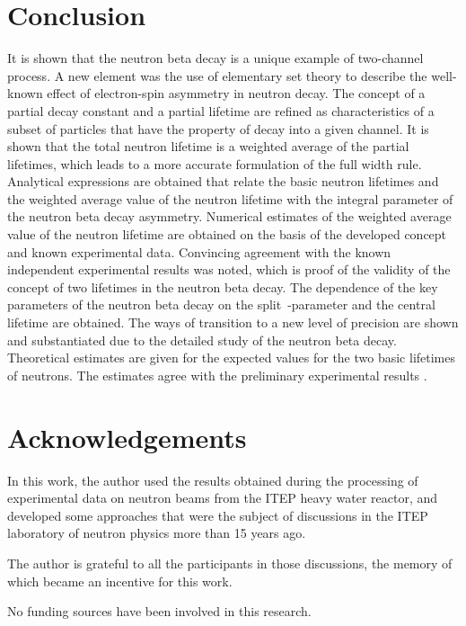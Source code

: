 \documentclass[article]{elsarticle}
\begin{document}
\section{Conclusion} 
\label{sect5:CONCL}
It is shown that the neutron beta decay is a unique example of two-channel process. A new element was the use of elementary set theory to describe the well-known effect of electron-spin asymmetry in neutron decay. The concept of a partial decay constant and a partial lifetime are refined as characteristics of a subset of particles that have the property of decay into a given channel. It is shown that the total neutron lifetime is a weighted average of the partial lifetimes, which leads to a more accurate formulation of the full width rule. Analytical expressions are obtained that relate the basic neutron lifetimes and the weighted average value of the neutron lifetime with the integral parameter of the neutron beta decay asymmetry.
Numerical estimates of the weighted average value of the neutron lifetime are obtained on the basis of the developed concept and known experimental data. Convincing agreement with the known independent experimental results was noted, which is proof of the validity of the concept of two lifetimes in the neutron beta decay.
The dependence of the key parameters of the neutron beta decay on the split~-parameter and the central lifetime are obtained. The ways of transition to a new level of precision are shown and substantiated due to the detailed study of the neutron beta decay. Theoretical estimates are given for the expected values for the two basic lifetimes of neutrons. 
The estimates agree with the preliminary experimental results \cite{VV4}.


\section{Acknowledgements} 
In this work, the author used the results obtained during the processing of experimental data 
on neutron beams from the ITEP heavy water reactor, and developed some approaches that 
were the subject of discussions in the ITEP laboratory of neutron physics more than 15 years ago. 

The author is grateful to all the participants in those discussions, the memory of which became an incentive for this work.

No funding sources have been involved in this research.
\end{document}
